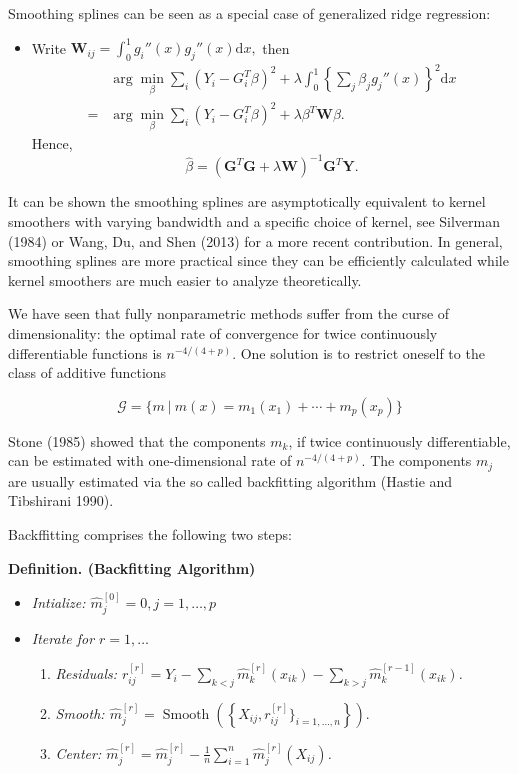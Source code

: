 \documentclass[
]{book}
\providecommand{\tightlist}{%
  \setlength{\itemsep}{0pt}\setlength{\parskip}{0pt}}
\begin{document}
Smoothing splines can be seen as a special case of generalized ridge regression:

\begin{itemize}
\tightlist
\item
  Write \(\mathbf W_{ij}=\int_0^1g_i''(x)g_j''(x)\mathrm dx,\) then
  \begin{align*}
    &\arg\min_{\beta} \sum_i (Y_i- G_i^T\beta)^2+\lambda\int_0^1 \left\{{\sum_j \beta_jg_j''}(x)\right\}^2\mathrm dx\\=
    &\arg\min_{\beta} \sum_i (Y_i- G_i^T\beta)^2+\lambda \beta^T \mathbf W \beta.
    \end{align*}
  Hence,
  \[
    \hat \beta= (\mathbf G^T\mathbf G+\lambda \mathbf W)^{-1}\mathbf G^T\mathbf Y.
    \]
\end{itemize}

It can be shown the smoothing splines are asymptotically equivalent to kernel smoothers with varying bandwidth and a specific choice of kernel, see Silverman (1984) or Wang, Du, and Shen (2013) for a more recent contribution. In general, smoothing splines are more practical since they can be efficiently calculated while kernel smoothers are much easier to analyze theoretically.

We have seen that fully nonparametric methods suffer from the curse of dimensionality: the optimal rate of convergence for twice continuously differentiable functions is \(n^{-4/(4+p)}\). One solution is to restrict oneself to the class of additive functions

\[
\mathcal G=\{m\ |\ m(x)=m_1(x_1)+\cdots +m_p(x_p)\}
\]

Stone (1985) showed that the components \(m_k\), if twice continuously differentiable, can be estimated with one-dimensional rate of \(n^{-4/(4+p)}\). The components \(m_j\) are usually estimated via the so called backfitting algorithm (Hastie and Tibshirani 1990).

Backffitting comprises the following two steps:

\textbf{Definition. (Backfitting Algorithm)}

\begin{itemize}
\tightlist
\item
  \emph{Intialize: \(\hat m_j^{[0]}=0, j=1,\dots,p\)}
\item
  \emph{Iterate for \(r=1,\dots\)}

  \begin{enumerate}
  \def\labelenumi{\arabic{enumi}.}
  \tightlist
  \item
    \emph{Residuals: \(r_{ij}^{[r]}=Y_i-\sum_{k < j} \hat{m}_{k}^{[r]}(x_{ik})-\sum_{k > j} \hat{m}_{k}^{[r-1]}(x_{ik})\).}
  \item
    \emph{Smooth: \(\hat{m}_j^{[r]}=\operatorname{Smooth}\left(\left\{X_{ij},r_{ij}^{[r]}\}_{i=1,\dots,n}\right\}\right).\)}
  \item
    \emph{Center: \(\hat{m}_j^{[r]}=\hat{m}_j^{[r]}-\frac{1}{n} \sum_{i=1}^n \hat{m}_j^{[r]}\left(X_{i j}\right)\).}
  \end{enumerate}
\end{itemize}
\end{document}
